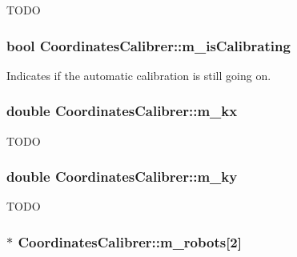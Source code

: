 \label{classCoordinatesCalibrer_a0fd71c87e90fc61802942e22c9584fb9}
TODO \hypertarget{classCoordinatesCalibrer_a2d3543afab02c87d0e06861d064bd265}{
\subsubsection[{m\_\-isCalibrating}]{\setlength{\rightskip}{0pt plus 5cm}bool {\bf CoordinatesCalibrer::m\_\-isCalibrating}}}
\label{classCoordinatesCalibrer_a2d3543afab02c87d0e06861d064bd265}
Indicates if the automatic calibration is still going on. \hypertarget{classCoordinatesCalibrer_a337af708f5dc1bfca0d191b988d8ab49}{
\subsubsection[{m\_\-kx}]{\setlength{\rightskip}{0pt plus 5cm}double {\bf CoordinatesCalibrer::m\_\-kx}}}
\label{classCoordinatesCalibrer_a337af708f5dc1bfca0d191b988d8ab49}
TODO \hypertarget{classCoordinatesCalibrer_a10648b2ef70a9ad0fd874e04f3b4d488}{
\subsubsection[{m\_\-ky}]{\setlength{\rightskip}{0pt plus 5cm}double {\bf CoordinatesCalibrer::m\_\-ky}}}
\label{classCoordinatesCalibrer_a10648b2ef70a9ad0fd874e04f3b4d488}
TODO \hypertarget{classCoordinatesCalibrer_aebcdb5e598d2af268ab93a0271c245b6}{
\subsubsection[{m\_\-robots}]{$\ast$ {\bf CoordinatesCalibrer::m\_\-robots}\mbox{[}2\mbox{]}}}
